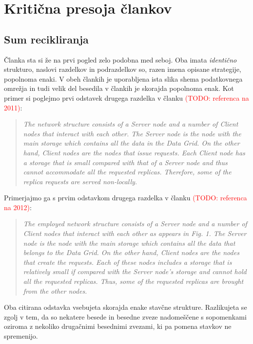\documentclass[a4paper, 12pt]{book}
\newcommand{\TODO}[1]{\textcolor{red}{(TODO: #1)}}
\newenvironment{itquote}
{\begin{quote}\itshape}
{\end{quote}}
\begin{document}
\chapter{Kritična presoja člankov}

\section{Sum recikliranja}

Članka sta si že na prvi pogled zelo podobna med seboj. Oba imata
\textit{identično} strukturo, naslovi razdelkov in podrazdelkov so, razen
imena opisane strategije, popolnoma enaki. V obeh člankih je uporabljena ista
slika shema podatkovnega omrežja in tudi velik del besedila v člankih je
skorajda popolnoma enak. Kot primer si poglejmo prvi odstavek drugega razdelka
v članku \TODO{referenca na 2011}:

\begin{itquote}
The network structure consists of a Server node and a number of
Client nodes that interact with each other. The Server node is the node
with the main storage which contains all the data in the Data Grid. On
the other hand, Client nodes are the nodes that issue requests. Each
Client node has a storage that is small compared with that of a Server
node and thus cannot accommodate all the requested replicas.
Therefore, some of the replica requests are served non-locally.
\end{itquote}

Primerjajmo ga s prvim odstavkom drugega razdelka v članku
\TODO{referenca na 2012}:

\begin{itquote}
The employed network structure consists of a Server node and a number of
Client nodes that interact with each other as appears in Fig. 1. The Server
node is the node with the main storage which contains all the data that
belongs to the Data Grid. On the other hand, Client nodes are the nodes that
create the requests. Each of these nodes includes a storage that is relatively
small if compared with the Server node’s storage and cannot hold all the
requested replicas. Thus, some of the requested replicas are brought from the
other nodes.
\end{itquote}

Oba citirana odstavka vsebujeta skorajda enake stavčne strukture. Razlikujeta
se zgolj v tem, da so nekatere besede in besedne zveze nadomeščene s
sopomenkami oziroma z nekoliko drugačnimi besednimi zvezami, ki pa pomena
stavkov ne spremenijo.
\end{document}
